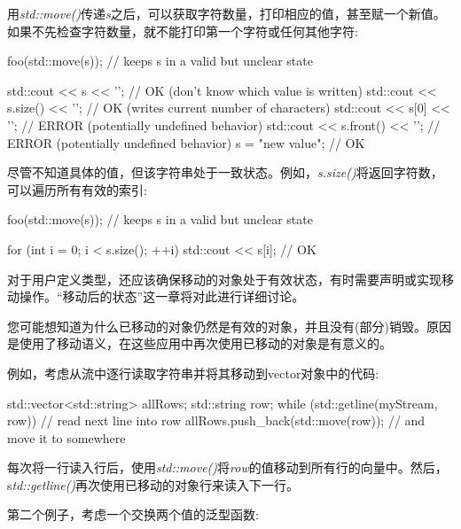 用\textit{std::move()}传递\textit{s}之后，可以获取字符数量，打印相应的值，甚至赋一个新值。如果不先检查字符数量，就不能打印第一个字符或任何其他字符:\par

\begin{codebox}[cpp]
foo(std::move(s)); // keeps s in a valid but unclear state

std::cout << s << '\n'; // OK (don’t know which value is written)
std::cout << s.size() << '\n'; // OK (writes current number of characters)
std::cout << s[0] << '\n'; // ERROR (potentially undefined behavior)
std::cout << s.front() << '\n'; // ERROR (potentially undefined behavior)
s = "new value"; // OK
\end{codebox}

尽管不知道具体的值，但该字符串处于一致状态。例如，\textit{s.size()}将返回字符数，可以遍历所有有效的索引:\par

\begin{codebox}[cpp]
foo(std::move(s)); // keeps s in a valid but unclear state

for (int i = 0; i < s.size(); ++i) {
  std::cout << s[i]; // OK
}
\end{codebox}

对于用户定义类型，还应该确保移动的对象处于有效状态，有时需要声明或实现移动操作。“移动后的状态”这一章将对此进行详细讨论。\par


您可能想知道为什么已移动的对象仍然是有效的对象，并且没有(部分)销毁。原因是使用了移动语义，在这些应用中再次使用已移动的对象是有意义的。\par

例如，考虑从流中逐行读取字符串并将其移动到vector对象中的代码:\par

\begin{codebox}[cpp]
std::vector<std::string> allRows;
std::string row;
while (std::getline(myStream, row)) { // read next line into row
  allRows.push_back(std::move(row)); // and move it to somewhere
}
\end{codebox}

每次将一行读入行后，使用\textit{std::move()}将\textit{row}的值移动到所有行的向量中。然后，s\textit{td::\allowbreak{}getline(\allowbreak{})\allowbreak{}}再次使用已移动的对象行来读入下一行。\par

第二个例子，考虑一个交换两个值的泛型函数:\par

